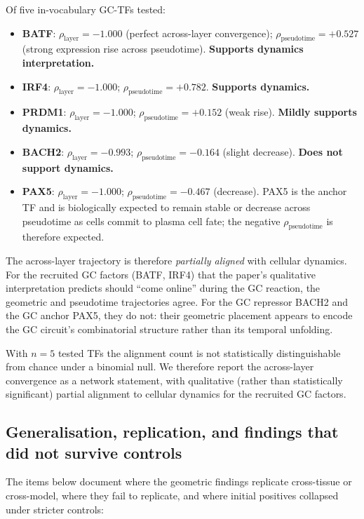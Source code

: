 \documentclass[12pt]{article}
\begin{document}
Of five in-vocabulary GC-TFs tested:
\begin{itemize}
\item \textbf{BATF}: $\rho_\text{layer} = -1.000$ (perfect across-layer convergence); $\rho_\text{pseudotime} = +0.527$ (strong expression rise across pseudotime). \textbf{Supports dynamics interpretation.}
\item \textbf{IRF4}: $\rho_\text{layer} = -1.000$; $\rho_\text{pseudotime} = +0.782$. \textbf{Supports dynamics.}
\item \textbf{PRDM1}: $\rho_\text{layer} = -1.000$; $\rho_\text{pseudotime} = +0.152$ (weak rise). \textbf{Mildly supports dynamics.}
\item \textbf{BACH2}: $\rho_\text{layer} = -0.993$; $\rho_\text{pseudotime} = -0.164$ (slight decrease). \textbf{Does not support dynamics.}
\item \textbf{PAX5}: $\rho_\text{layer} = -1.000$; $\rho_\text{pseudotime} = -0.467$ (decrease). PAX5 is the anchor TF and is biologically expected to remain stable or decrease across pseudotime as cells commit to plasma cell fate; the negative $\rho_\text{pseudotime}$ is therefore expected.
\end{itemize}

The across-layer trajectory is therefore \emph{partially aligned} with cellular dynamics. For the recruited GC factors (BATF, IRF4) that the paper's qualitative interpretation predicts should ``come online'' during the GC reaction, the geometric and pseudotime trajectories agree. For the GC repressor BACH2 and the GC anchor PAX5, they do not: their geometric placement appears to encode the GC circuit's combinatorial structure rather than its temporal unfolding.

With $n = 5$ tested TFs the alignment count is not statistically distinguishable from chance under a binomial null. We therefore report the across-layer convergence as a network statement, with qualitative (rather than statistically significant) partial alignment to cellular dynamics for the recruited GC factors.

\subsection{Generalisation, replication, and findings that did not survive controls}
\label{sec:negatives}

The items below document where the geometric findings replicate cross-tissue or cross-model, where they fail to replicate, and where initial positives collapsed under stricter controls:
\end{document}
